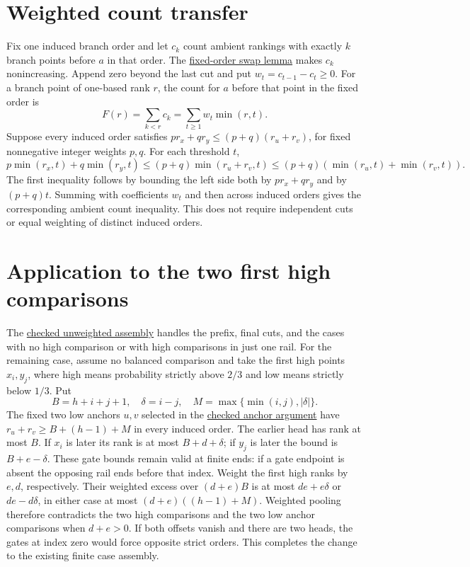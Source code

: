 \documentclass[11pt,letterpaper]{article}
\begin{document}
\section*{Weighted count transfer}
Fix one induced branch order and let \(c_k\) count ambient rankings
with exactly \(k\) branch points before \(a\) in that order.
The \href{https://github.com/Aafimalek/novel-discoveries/commit/2c65834be82b6d2f1dc072a26c8f4c7994bcb946}{fixed-order swap lemma}
makes \(c_k\) nonincreasing. Append zero beyond the last cut
and put \(w_t=c_{t-1}-c_t\ge0\). For a branch point of one-based
rank \(r\), the count for \(a\) before that point in the fixed order is
\[
 F(r)=\sum_{k<r}c_k=\sum_{t\ge1}w_t\min(r,t).
\]
Suppose every induced order satisfies
\(p r_x+q r_y\le(p+q)(r_u+r_v)\), for fixed nonnegative
integer weights \(p,q\). For each threshold \(t\),
\[
 p\min(r_x,t)+q\min(r_y,t)
 \le(p+q)\min(r_u+r_v,t)
 \le(p+q)(\min(r_u,t)+\min(r_v,t)).
\]
The first inequality follows by bounding the left side both by
\(p r_x+q r_y\) and by \((p+q)t\). Summing with coefficients \(w_t\)
and then across induced orders gives the corresponding ambient count
inequality. This does not require independent cuts or equal weighting
of distinct induced orders.

\section*{Application to the two first high comparisons}
The \href{https://github.com/Aafimalek/novel-discoveries/tree/5b1476e2b00d787dc6ae630fefd4b8510d0e50e3/width-three-posets/verification/diagonal-gated-two-arm-branches/lean-complete-rank-only-class}{checked
unweighted assembly} handles the prefix, final cuts, and the cases
with no high comparison or with high comparisons in just one rail.
For the remaining case, assume no balanced comparison and take the
first high points \(x_i,y_j\), where high means probability strictly
above \(2/3\) and low means strictly below \(1/3\). Put
\[
 B=h+i+j+1,\quad \delta=i-j,\quad
 M=\max\{\min(i,j),|\delta|\}.
\]
The fixed two low anchors \(u,v\) selected in the
\href{https://github.com/Aafimalek/novel-discoveries/tree/1ec4dfe997e57556815c849c30fb2cc4c384428e/width-three-posets/verification/diagonal-gated-two-arm-branches/lean-all-fixed-anchors}{checked
anchor argument} have \(r_u+r_v\ge B+(h-1)+M\) in every induced order.
The earlier head has rank at most \(B\). If \(x_i\) is later its
rank is at most \(B+d+\delta\); if \(y_j\) is later the bound is
\(B+e-\delta\). These gate bounds remain valid at finite ends:
if a gate endpoint is absent the opposing rail ends before that
index. Weight the first high ranks by \(e,d\), respectively. Their
weighted excess over \((d+e)B\) is at most
\(de+e\delta\) or \(de-d\delta\), in either case at most
\((d+e)((h-1)+M)\). Weighted pooling therefore contradicts
the two high comparisons and the two low anchor comparisons
when \(d+e>0\). If both offsets vanish and there are two heads,
the gates at index zero would force opposite strict orders.
This completes the change to the existing finite case assembly.
\end{document}

